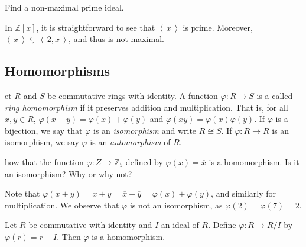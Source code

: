 \documentclass[english,course]{lecture}
\newcommand{\ideal}[1]{\left\langle\, #1 \,\right\rangle}
\def\p{\varphi}
\newenvironment{solution}[1][Solution]{\begin{trivlist}\pushQED{\qed}\item[\hskip \labelsep  \bfseries #1{}.\hspace{10pt}]}{\popQED\end{trivlist}}\renewcommand{\qedsymbol}{$\checkmark$}{\newenvironment{answer}{\renewcommand\qedsymbol{$\blacklozenge$}\begin{proof}[Answer]}{\end{proof}}}\newenvironment{answer}[1][Answer]{\begin{trivlist}\pushQED{\qed}\item[\hskip \labelsep  \bfseries #1{}.\hspace{10pt}]}{\popQED\end{trivlist}}\renewcommand{\qedsymbol}{$\lozenge$}
\theoremstyle{plain}
\newenvironment{exercise}[1]
  {\renewcommand\theinnerexercise{#1}\innerexercise}
  {\endinnerexercise}
\newenvironment{definition}[1]
  {\renewcommand\theinnerdefinition{#1}\innerdefinition}
  {\endinnerdefinition}
\def\Z{{\mathbb Z}}
\def\presnotes{}
\begin{document}

\begin{challenge}
	Find a non-maximal prime ideal.
\end{challenge}



\begin{solution}
	In $\Z[x]$, it is straightforward to see that $\ideal{x}$ is prime. Moreover, $\ideal{x}\subsetneq \ideal{2,x}$, and thus is not maximal.
\end{solution}


\subsection{Homomorphisms}

\begin{definition}
	Let $R$ and $S$ be commutative rings with identity.
	A function $\p : R\to S$ is a called \emph{ring homomorphism} if it preserves addition and multiplication.
	That is, for all $x,y\in R$, $\p(x+y) = \p(x) + \p(y)$ and $\p(xy) = \p(x)\p(y)$.
	If $\p$ is a bijection, we say that $\p$ is an \emph{isomorphism} and write $R\cong S$.
	If $\p : R\to R$ is an isomorphism, we say $\p$ is an \emph{automorphism} of $R$.
\end{definition}


\begin{exercise}
	Show that the function $\p : Z\to \Z_{5}$ defined by $\p(x) = \overline{x}$ is a homomorphism.
	Is it an isomorphism? Why or why not?
\end{exercise}

\begin{solution}
	Note that $\p(x+y) = \overline{x+y} = \overline{x} + \overline{y} = \p(x) + \p(y)$, and similarly for multiplication.
	We observe that $\p$ is not an isomorphism, as $\p(2) = \p(7) = \overline{2}$.
\end{solution}


\begin{theorem}
	Let $R$ be commutative with identity and $I$ an ideal of $R$. Define $\p: R\to R/I$ by $\p(r) = r+I$. Then $\p$ is a homomorphism.
\end{theorem}

\begin{solution}

\end{solution}
\end{document}

